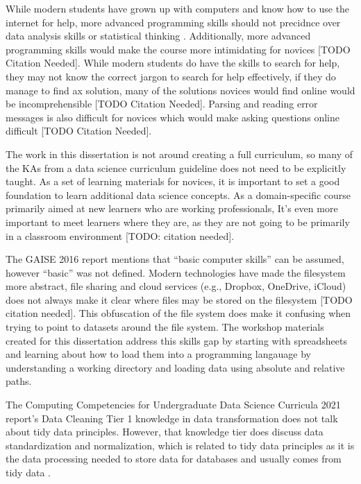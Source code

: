 \documentclass[../main.tex]{subfiles}
\begin{document}
        While modern students have grown up with computers and know how to use the internet for help,
        more advanced programming skills should not precidnce over data analysis skills or statistical thinking
        \cite{gaise2016}.
        Additionally, more advanced programming skills would make the course more intimidating for novices [TODO Citation Needed].
        While modern students do have the skills to search for help,
        they may not know the correct jargon to search for help effectively,
        if they do manage to find ax solution,
        many of the solutions novices would find online would be incomprehensible [TODO Citation Needed].
        Parsing and reading error messages is also difficult for novices which would make asking questions online difficult [TODO Citation Needed].

        The work in this dissertation is not around creating a full curriculum,
        so many of the KAs from a data science curriculum guideline does not need to be explicitly taught.
        As a set of learning materials for novices,
        it is important to set a good foundation to learn additional data science concepts.
        As a domain-specific course primarily aimed at new learners who are working professionals,
        It's even more important to meet learners where they are, as they are not going to be primarily in a classroom environment
        [TODO: citation needed].

        The GAISE 2016 report mentions that ``basic computer skills'' can be assumed,
        however ``basic'' was not defined.
        Modern technologies have made the filesystem more abstract,
        file sharing and cloud services (e.g., Dropbox, OneDrive, iCloud) does not always make it clear where files may be stored on the filesystem [TODO citation needed].
        This obfuscation of the file system does make it confusing when trying to point to datasets around the file system.
        The workshop materials created for this dissertation address this skills gap by starting with spreadsheets and learning about how to load them into a programming langauage
        by understanding a working directory and loading data using absolute and relative paths.

        The Computing Competencies for Undergraduate Data Science Curricula 2021 report's
        Data Cleaning Tier 1 knowledge in data transformation does not talk about tidy data principles.
        However, that knowledge tier does discuss data standardization and normalization,
        which is related to tidy data principles as it is the data processing needed to store data for databases and
        usually comes from tidy data
        \cite{wickhamTidyData2014}.
        
\end{document}

